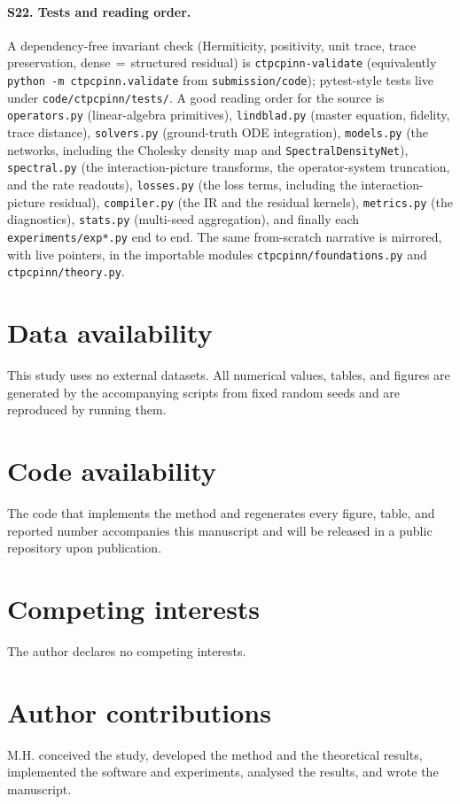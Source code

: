 \documentclass[11pt]{article}
\begin{document}
\paragraph{S22. Tests and reading order.}
A dependency-free invariant check (Hermiticity, positivity, unit trace, trace preservation, dense$\,=\,$structured residual) is \texttt{ctpcpinn-validate} (equivalently \texttt{python -m ctpcpinn.validate} from \texttt{submission/code}); pytest-style tests live under \texttt{code/ctpcpinn/tests/}. A good reading order for the source is \texttt{operators.py} (linear-algebra primitives), \texttt{lindblad.py} (master equation, fidelity, trace distance), \texttt{solvers.py} (ground-truth ODE integration), \texttt{models.py} (the networks, including the Cholesky density map and \texttt{SpectralDensityNet}), \texttt{spectral.py} (the interaction-picture transforms, the operator-system truncation, and the rate readouts), \texttt{losses.py} (the loss terms, including the interaction-picture residual), \texttt{compiler.py} (the IR and the residual kernels), \texttt{metrics.py} (the diagnostics), \texttt{stats.py} (multi-seed aggregation), and finally each \texttt{experiments/exp*.py} end to end. The same from-scratch narrative is mirrored, with live pointers, in the importable modules \texttt{ctpcpinn/foundations.py} and \texttt{ctpcpinn/theory.py}.

\section*{Data availability}
This study uses no external datasets. All numerical values, tables, and figures are generated by the accompanying scripts from fixed random seeds and are reproduced by running them.

\section*{Code availability}
The code that implements the method and regenerates every figure, table, and reported number accompanies this manuscript and will be released in a public repository upon publication.

\section*{Competing interests}
The author declares no competing interests.

\section*{Author contributions}
M.H. conceived the study, developed the method and the theoretical results, implemented the software and experiments, analysed the results, and wrote the manuscript.
\end{document}
